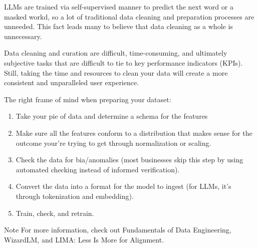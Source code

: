 LLMs are trained via self-supervised manner to predict the next word or a masked workd, so a lot of traditional data cleaning and preparation processes are unneeded. This fact leads many to believe that data cleaning as a whole is unnecessary. 

Data cleaning and curation are difficult, time-consuming, and ultimately subjective tasks that are difficult to tie to key performance indicators (KPIs). Still, taking the time and resources to clean your data will create a more consistent and unparalleled user experience. 

The right frame of mind when preparing your dataset:
\begin{enumerate}
	\item Take your pie of data and determine a schema for the features
	\item Make sure all the features conform to a distribution that makes sense for the outcome your're trying to get through normalization or scaling.
	\item Check the data for bia/anomalies (most businesses skip this step by using automated checking instead of informed verification).
	\item Convert the data into a format for the model to ingest (for LLMs, it's through tokenization and embedding).
	\item Train, check, and retrain.
\end{enumerate}

\begin{commentbox}{Note}
	For more information, check out Fundamentals of Data Engineering, WizardLM, and LIMA: Less Is More for Alignment. 
\end{commentbox}


